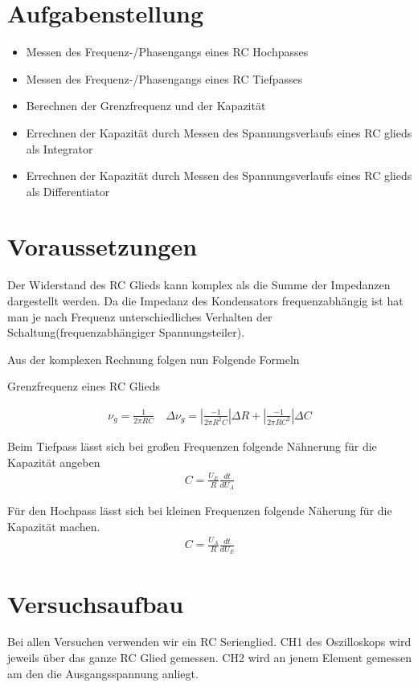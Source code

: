 \documentclass[a4paper]{article}
\begin{document}
\section{Aufgabenstellung}
\begin{itemize}
  \item Messen des Frequenz-/Phasengangs eines RC Hochpasses
  \item Messen des Frequenz-/Phasengangs eines RC Tiefpasses
  \item Berechnen der Grenzfrequenz und der Kapazität
  \item Errechnen der Kapazität durch Messen des Spannungsverlaufs eines RC glieds als Integrator
  \item Errechnen der Kapazität durch Messen des Spannungsverlaufs eines RC glieds als Differentiator
\end{itemize}

\section{Voraussetzungen}
  Der Widerstand des RC Glieds kann komplex als die Summe der Impedanzen dargestellt werden. Da die Impedanz des Kondensators frequenzabhängig ist hat man je nach Frequenz unterschiedliches Verhalten der Schaltung(frequenzabhängiger Spannungsteiler). 

  Aus der komplexen Rechnung folgen nun Folgende Formeln

  Grenzfrequenz eines RC Glieds

  \begin{align}
    \nu_g = \frac{1}{2 \pi R C} \quad
    \Delta \nu_g = \left | \frac{-1}{2 \pi R^2 C} \right | \Delta R + \left | \frac{-1}{2 \pi R C^2}\right | \Delta C
  \end{align}

Beim Tiefpass lässt sich bei großen Frequenzen folgende Nähnerung für die Kapazität angeben
\begin{align}
  C = \frac{U_E}{R}\frac{dt}{d U_A}  
\end{align}

Für den Hochpass lässt sich bei kleinen Frequenzen folgende Näherung für die Kapazität machen.
\begin{align}
  C=\frac{U_A}{R}\frac{dt}{d U_E}  
\end{align}

\section{Versuchsaufbau}
Bei allen Versuchen verwenden wir ein RC Serienglied.
CH1 des Oszilloskops wird jeweils über das ganze RC Glied gemessen.
CH2 wird an jenem Element gemessen am den die Ausgangsspannung anliegt.
\end{document}
